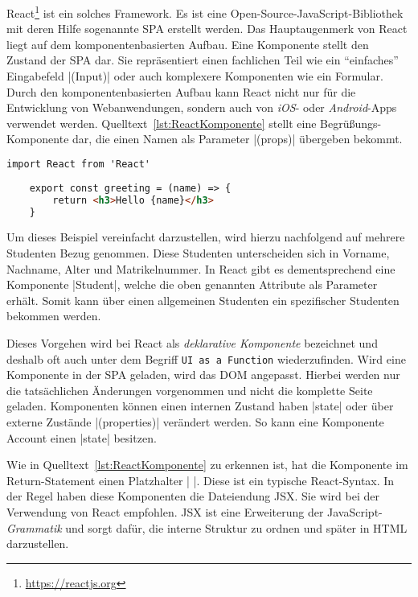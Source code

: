 React\footnote{\url{https://reactjs.org}} ist ein solches Framework.
Es ist eine Open-Source-JavaScript-Bibliothek mit deren Hilfe sogenannte \ac{SPA} erstellt werden.\autocite[Vgl.][]{hartmann2019react}
Das Hauptaugenmerk von React liegt auf dem komponentenbasierten Aufbau.
Eine Komponente stellt den Zustand der \ac{SPA} dar.
Sie repräsentiert einen fachlichen Teil wie \zb ein \enquote{einfaches} Eingabefeld \jinline|(Input)| oder auch komplexere Komponenten wie ein Formular.
Durch den komponentenbasierten Aufbau kann React nicht nur für die Entwicklung von Webanwendungen, sondern auch von \emph{iOS}- oder \emph{Android}-Apps verwendet werden.
Quelltext~\vref{lst:ReactKomponente} stellt eine Begrüßungs-Komponente dar, die einen Namen als Parameter \jinline|(props)| übergeben bekommt.

\begin{lstlisting}[caption={React-Komponente: Greeting},label={lst:ReactKomponente},language=HTML, showstringspaces={false}]
	import React from 'React'
	
	export const greeting = (name) => {
		return <h3>Hello {name}</h3>
	}
\end{lstlisting}

Um dieses Beispiel vereinfacht darzustellen, wird hierzu nachfolgend auf mehrere Studenten Bezug genommen.
Diese Studenten unterscheiden sich \zb in Vorname, Nachname, Alter und Matrikelnummer.
In React gibt es dementsprechend eine Komponente \jinline|Student|, welche die oben genannten Attribute als Parameter erhält.
Somit kann über einen allgemeinen Studenten ein spezifischer Studenten bekommen werden.

Dieses Vorgehen wird bei React als \emph{deklarative Komponente} bezeichnet und deshalb oft auch unter dem Begriff \texttt{UI as a Function} wiederzufinden.\autocite[Vgl.][]{hartmann2019react}
Wird eine Komponente in der \acs{SPA} geladen, wird das \acs{DOM} angepasst.
Hierbei werden nur die tatsächlichen Änderungen vorgenommen und nicht die komplette Seite geladen. \newline
Komponenten können einen internen Zustand haben \jinline|state| oder über externe Zustände \jinline|(properties)| verändert werden.
So kann \zb eine Komponente Account einen \jinline|state| besitzen.

Wie in Quelltext~\vref{lst:ReactKomponente} zu erkennen ist, hat die Komponente im Return-Statement einen Platzhalter \jinline|{ }|.
Diese ist ein typische React-Syntax.
In der Regel haben diese Komponenten die Dateiendung \acs{JSX}.
Sie wird bei der Verwendung von React empfohlen.
\acs{JSX} ist eine Erweiterung der JavaScript-\emph{Grammatik} und sorgt dafür, die interne Struktur zu ordnen und später in \acs{HTML} darzustellen.\autocite[Vgl.][]{WasIstJSX}

